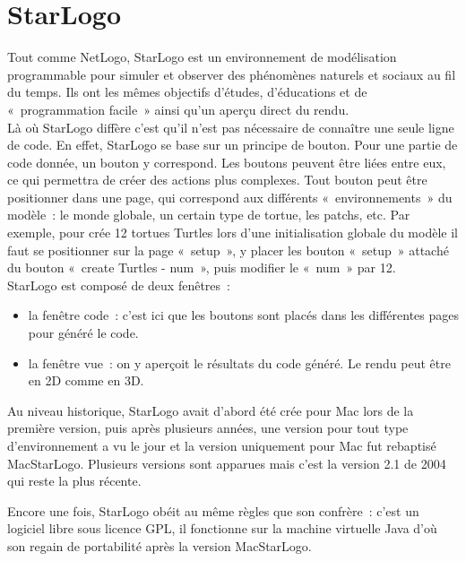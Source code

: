 \section{StarLogo}
Tout comme NetLogo, StarLogo est un environnement de modélisation programmable pour simuler et observer des phénomènes naturels et sociaux au fil du temps.
Ils ont les mêmes objectifs d'études, d'éducations et de «~programmation facile~» ainsi qu'un aperçu direct du rendu.
\\

Là où StarLogo diffère c'est qu'il n'est pas nécessaire de connaître une seule ligne de code. En effet, StarLogo se base sur un principe de bouton. Pour une partie de code donnée, un bouton y correspond. Les boutons peuvent être liées entre eux, ce qui permettra de créer des actions plus complexes.
Tout bouton peut être positionner dans une page, qui correspond aux différents «~environnements~» du modèle~: le monde globale, un certain type de tortue, les patchs, etc.
Par exemple, pour crée 12 tortues Turtles lors d'une initialisation globale du modèle il faut se positionner sur la page «~setup~», y placer les bouton «~setup~» attaché du bouton «~create Turtles - num~», puis modifier le «~num~» par 12.\\


StarLogo est composé de deux fenêtres~:
\begin{itemize}
  \item la fenêtre code~: c'est ici que les boutons sont placés dans les différentes pages pour généré le code.
  \item la fenêtre vue~: on y aperçoit le résultats du code généré. Le rendu peut être en 2D comme en 3D.\\
\end{itemize}

Au niveau historique, StarLogo avait d'abord été crée pour Mac lors de la première version, puis après plusieurs années, une version pour tout type d'environnement a vu le jour et la version uniquement pour Mac fut rebaptisé MacStarLogo. Plusieurs versions sont apparues mais c'est la version 2.1 de 2004 qui reste la plus récente.


Encore une fois, StarLogo obéit au même règles que son confrère~: c'est un logiciel libre sous licence GPL, il fonctionne sur la machine virtuelle Java d'où son regain de portabilité après la version MacStarLogo.
